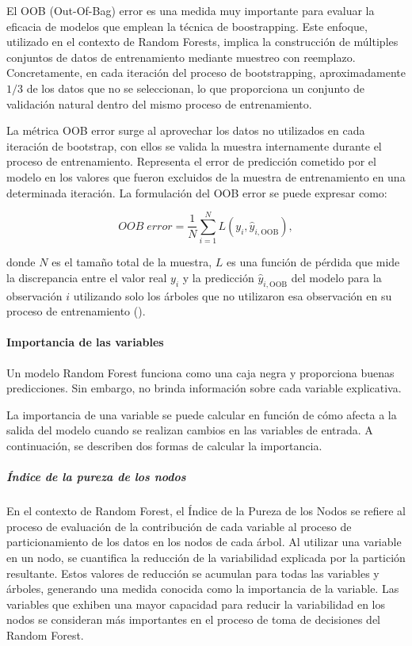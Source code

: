 El OOB (Out-Of-Bag) error es una medida muy importante para evaluar la eficacia de modelos que emplean la técnica de boostrapping. Este enfoque,  utilizado en el contexto de Random Forests, implica la construcción de múltiples conjuntos de datos de entrenamiento mediante muestreo con reemplazo. Concretamente, en cada iteración del proceso de bootstrapping, aproximadamente \(1/3\) de los datos que no se seleccionan, lo que proporciona un conjunto de validación natural dentro del mismo proceso de entrenamiento. 

La métrica OOB error surge al aprovechar los datos no utilizados en cada iteración de bootstrap, con ellos se valida la muestra internamente durante el proceso de entrenamiento. Representa el error de predicción cometido por el modelo en los valores que fueron excluidos de la muestra de entrenamiento en una determinada iteración. La formulación del OOB error se puede expresar como:

\[
OOB\; error = \frac{1}{N} \sum_{i=1}^{N} L(y_i, \hat{y}_{i,\text{OOB}})
,\]

donde \(N\) es el tamaño total de la muestra, \(L\) es una función de pérdida que mide la discrepancia entre el valor real \(y_i\) y la predicción \(\hat{y}_{i,\text{OOB}}\) del modelo para la observación \(i\) utilizando solo los árboles que no utilizaron esa observación en su proceso de entrenamiento (\cite{james2013introduction}).


\paragraph{Importancia de las variables}\label{sec:importancia-variables}

Un modelo Random Forest funciona como una caja negra y proporciona buenas predicciones. Sin embargo, no brinda información sobre cada variable explicativa.

La importancia de una variable se puede calcular en función de cómo afecta a la salida del modelo cuando se realizan cambios en las variables de entrada. A continuación, se describen dos formas de calcular la importancia.

\subparagraph{Índice de la pureza de los nodos}

En el contexto de Random Forest, el Índice de la Pureza de los Nodos se refiere al proceso de evaluación de la contribución de cada variable al proceso de particionamiento de los datos en los nodos de cada árbol. Al utilizar una variable en un nodo, se cuantifica la reducción de la variabilidad explicada por la partición resultante. Estos valores de reducción se acumulan para todas las variables y árboles, generando una medida conocida como la importancia de la variable. Las variables que exhiben una mayor capacidad para reducir la variabilidad en los nodos se consideran más importantes en el proceso de toma de decisiones del Random Forest.

